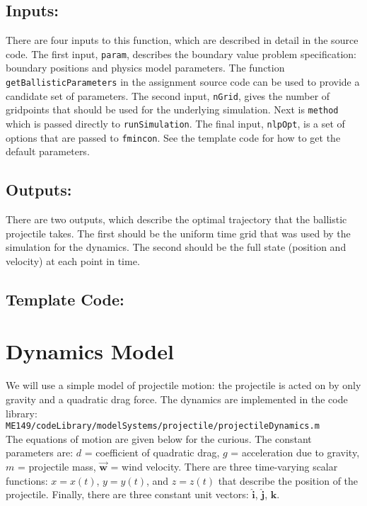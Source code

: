 \subsection*{Inputs:}

There are four inputs to this function, which are described in detail in the source code.
The first input, \texttt{param}, describes the boundary value problem specification:
boundary positions and physics model parameters.
The function \texttt{getBallisticParameters} in the assignment source code can be used
to provide a candidate set of parameters.
The second input, \texttt{nGrid}, gives the number of gridpoints
that should be used for the underlying simulation.
Next is \texttt{method} which is passed directly to \texttt{runSimulation}.
The final input, \texttt{nlpOpt}, is a set of options that are passed to \texttt{fmincon}.
See the template code for how to get the default parameters.

\subsection*{Outputs:}

There are two outputs, which describe the optimal trajectory that the ballistic projectile takes.
The first should be the uniform time grid that was used by the simulation for the dynamics.
The second should be the full state (position and velocity) at each point in time.

\pagebreak
\subsection*{Template Code:}




\pagebreak

\section*{Dynamics Model}

We will use a simple model of projectile motion:
the projectile is acted on by only gravity and a quadratic drag force.
The dynamics are implemented in the code library: \\
\texttt{ME149/codeLibrary/modelSystems/projectile/projectileDynamics.m} \\
The equations of motion are given below for the curious.
The constant parameters are:
$d$ = coefficient of quadratic drag,
$g$ = acceleration due to gravity,
$m$ = projectile mass,
$\bm{\vec{w}}$ = wind velocity.
There are three time-varying scalar functions:
$x = x(t)$, $y = y(t)$, and $z = z(t)$ that describe the position of the projectile.
Finally, there are three constant unit vectors:
$ \hat{\bm{i}}$, $\bm{\hat{j}}$, $\hat{\bm{k}}$.

